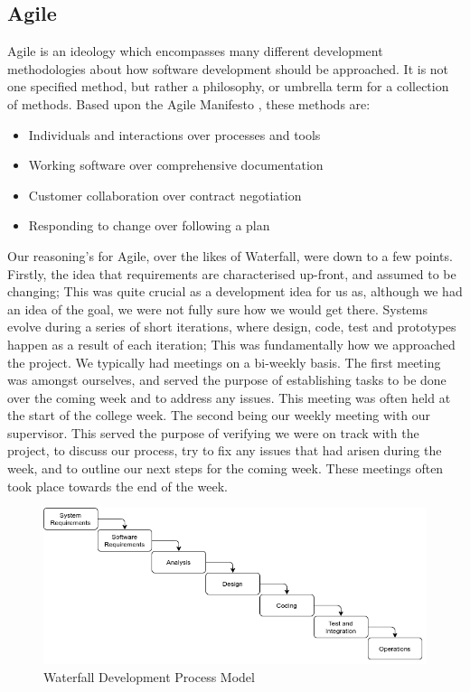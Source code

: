 \subsection{Agile}
Agile is an ideology which encompasses many different development methodologies about how software development should be approached. It is not one specified method, but rather a philosophy, or umbrella term for a collection of methods. Based upon the Agile Manifesto \cite{fowler2001agile}, these methods are:
\begin{itemize}
	\item Individuals and interactions over processes and tools
	\item Working software over comprehensive documentation
	\item Customer collaboration over contract negotiation
	\item Responding to change over following a plan
\end{itemize}
Our reasoning's for Agile, over the likes of Waterfall, were down to a few points. Firstly, the idea that requirements are characterised up-front, and assumed to be changing; This was quite crucial as a development idea for us as, although we had an idea of the goal, we were not fully sure how we would get there. Systems evolve during a series of short iterations, where design, code, test and prototypes happen as a result of each iteration; This was fundamentally how we approached the project. We typically had meetings on a bi-weekly basis. The first meeting was amongst ourselves, and served the purpose of establishing tasks to be done over the coming week and to address any issues. This meeting was often held at the start of the college week. The second being our weekly meeting with our supervisor. This served the purpose of verifying we were on track with the project, to discuss our process, try to fix any issues that had arisen during the week, and to outline our next steps for the coming week. These meetings often took place towards the end of the week.

\begin{figure}[h!]
    \caption{Waterfall Development Process Model}
    \label{image:waterfallModel}
    \centering
    \includegraphics[width=1.0\textwidth]{images/WaterfallModel.png}
\end{figure}



